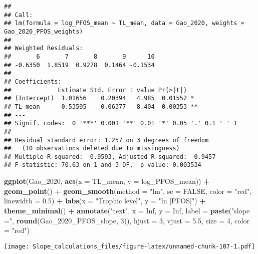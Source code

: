 \documentclass[
]{article}
\newenvironment{Shaded}{\begin{snugshade}}{\end{snugshade}}
\newcommand{\AttributeTok}[1]{\textcolor[rgb]{0.13,0.29,0.53}{#1}}
\newcommand{\ConstantTok}[1]{\textcolor[rgb]{0.56,0.35,0.01}{#1}}
\newcommand{\DecValTok}[1]{\textcolor[rgb]{0.00,0.00,0.81}{#1}}
\newcommand{\FloatTok}[1]{\textcolor[rgb]{0.00,0.00,0.81}{#1}}
\newcommand{\FunctionTok}[1]{\textcolor[rgb]{0.13,0.29,0.53}{\textbf{#1}}}
\newcommand{\NormalTok}[1]{#1}
\newcommand{\SpecialCharTok}[1]{\textcolor[rgb]{0.81,0.36,0.00}{\textbf{#1}}}
\newcommand{\StringTok}[1]{\textcolor[rgb]{0.31,0.60,0.02}{#1}}
\begin{document}
\begin{verbatim}
## 
## Call:
## lm(formula = log_PFOS_mean ~ TL_mean, data = Gao_2020, weights = Gao_2020_PFOS_weights)
## 
## Weighted Residuals:
##       6       7       8       9      10 
## -0.6350  1.8519  0.9278  0.1464 -0.1534 
## 
## Coefficients:
##             Estimate Std. Error t value Pr(>|t|)   
## (Intercept)  1.01656    0.20394   4.985  0.01552 * 
## TL_mean      0.53595    0.06377   8.404  0.00353 **
## ---
## Signif. codes:  0 '***' 0.001 '**' 0.01 '*' 0.05 '.' 0.1 ' ' 1
## 
## Residual standard error: 1.257 on 3 degrees of freedom
##   (10 observations deleted due to missingness)
## Multiple R-squared:  0.9593, Adjusted R-squared:  0.9457 
## F-statistic: 70.63 on 1 and 3 DF,  p-value: 0.003534
\end{verbatim}

\begin{Shaded}
\begin{Highlighting}[]
\FunctionTok{ggplot}\NormalTok{(Gao\_2020, }\FunctionTok{aes}\NormalTok{(}\AttributeTok{x =}\NormalTok{ TL\_mean, }\AttributeTok{y =}\NormalTok{ log\_PFOS\_mean)) }\SpecialCharTok{+}
  \FunctionTok{geom\_point}\NormalTok{() }\SpecialCharTok{+}
  \FunctionTok{geom\_smooth}\NormalTok{(}\AttributeTok{method =} \StringTok{"lm"}\NormalTok{, }\AttributeTok{se =} \ConstantTok{FALSE}\NormalTok{, }\AttributeTok{color =} \StringTok{"red"}\NormalTok{, }\AttributeTok{linewidth =} \FloatTok{0.5}\NormalTok{) }\SpecialCharTok{+}
  \FunctionTok{labs}\NormalTok{(}\AttributeTok{x =} \StringTok{"Trophic level"}\NormalTok{,}
       \AttributeTok{y =} \StringTok{"ln [PFOS]"}\NormalTok{) }\SpecialCharTok{+}
  \FunctionTok{theme\_minimal}\NormalTok{() }\SpecialCharTok{+}
  \FunctionTok{annotate}\NormalTok{(}\StringTok{"text"}\NormalTok{, }\AttributeTok{x =} \ConstantTok{Inf}\NormalTok{, }\AttributeTok{y =} \ConstantTok{Inf}\NormalTok{, }\AttributeTok{label =} \FunctionTok{paste}\NormalTok{(}\StringTok{"slope ="}\NormalTok{, }\FunctionTok{round}\NormalTok{(Gao\_2020\_PFOS\_slope, }\DecValTok{3}\NormalTok{)), }
           \AttributeTok{hjust =} \DecValTok{3}\NormalTok{, }\AttributeTok{vjust =} \FloatTok{5.5}\NormalTok{, }\AttributeTok{size =} \DecValTok{4}\NormalTok{, }\AttributeTok{color =} \StringTok{"red"}\NormalTok{)}
\end{Highlighting}
\end{Shaded}

\texttt{[image: Slope\_calculations\_files/figure-latex/unnamed-chunk-107-1.pdf]}
\end{document}
